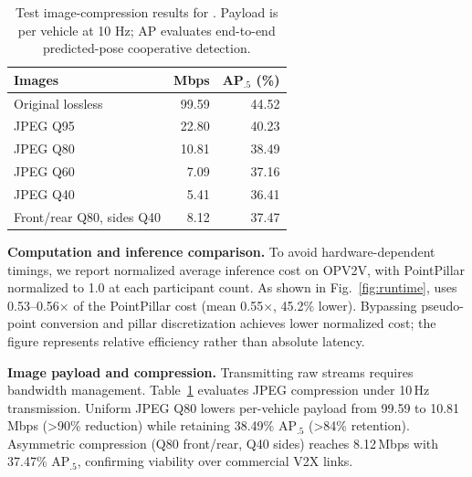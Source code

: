 \begin{table}[t]
\centering\small
\caption{Test image-compression results for \method{}. Payload is per vehicle at 10 Hz; AP evaluates end-to-end predicted-pose cooperative detection.}
\label{tab:compression}
\begin{tabular}{lrr}\toprule
Images & Mbps & AP$_{.5}$ (\%)\\\midrule
Original lossless & 99.59 & 44.52\\
JPEG Q95 & 22.80 & 40.23\\
JPEG Q80 & 10.81 & 38.49\\
JPEG Q60 & 7.09 & 37.16\\
JPEG Q40 & 5.41 & 36.41\\
Front/rear Q80, sides Q40 & 8.12 & 37.47\\\bottomrule
\end{tabular}
\end{table}

\textbf{Computation and inference comparison.} To avoid hardware-dependent timings, we report normalized average inference cost on OPV2V, with PointPillar normalized to 1.0 at each participant count. As shown in Fig.~\ref{fig:runtime}, \method{} uses 0.53--0.56$\times$ of the PointPillar cost (mean 0.55$\times$, 45.2\% lower). Bypassing pseudo-point conversion and pillar discretization achieves lower normalized cost; the figure represents relative efficiency rather than absolute latency.

\textbf{Image payload and compression.} Transmitting raw streams requires bandwidth management. Table~\ref{tab:compression} evaluates JPEG compression under 10\,Hz transmission. Uniform JPEG Q80 lowers per-vehicle payload from 99.59 to 10.81\,Mbps (>90\% reduction) while retaining 38.49\% AP$_{.5}$ (>84\% retention). Asymmetric compression (Q80 front/rear, Q40 sides) reaches 8.12\,Mbps with 37.47\% AP$_{.5}$, confirming viability over commercial V2X links.
